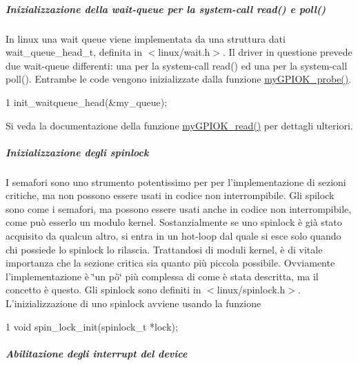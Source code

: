 \subparagraph*{Inizializzazione della wait-\/queue per la system-\/call read() e poll()}

In linux una wait queue viene implementata da una struttura dati wait\+\_\+queue\+\_\+head\+\_\+t, definita in $<$linux/wait.\+h$>$. Il driver in questione prevede due wait-\/queue differenti\+: una per la system-\/call read() ed una per la system-\/call poll(). Entrambe le code vengono inizializzate dalla funzione \hyperlink{group___linux-_driver_gae40973a06d72f7c41a9af07513a62307}{my\+G\+P\+I\+O\+K\+\_\+probe()}. 
\begin{DoxyCode}
1 init\_waitqueue\_head(&my\_queue);
\end{DoxyCode}
 Si veda la documentazione della funzione \hyperlink{group___linux-_driver_ga90ac339df9c02ae5f11a2a7727adc923}{my\+G\+P\+I\+O\+K\+\_\+read()} per dettagli ulteriori.

\subparagraph*{Inizializzazione degli spinlock}

I semafori sono uno strumento potentissimo per per l'implementazione di sezioni critiche, ma non possono essere usati in codice non interrompibile. Gli spilock sono come i semafori, ma possono essere usati anche in codice non interrompibile, come può esserlo un modulo kernel. Sostanzialmente se uno spinlock è già stato acquisito da qualcun altro, si entra in un hot-\/loop dal quale si esce solo quando chi possiede lo spinlock lo rilascia. Trattandosi di moduli kernel, è di vitale importanza che la sezione critica sia quanto più piccola possibile. Ovviamente l'implementazione è \char`\"{}un pò\char`\"{} più complessa di come è stata descritta, ma il concetto è questo. Gli spinlock sono definiti in $<$linux/spinlock.\+h$>$. L'inizializzazione di uno spinlock avviene usando la funzione 
\begin{DoxyCode}
1 void spin\_lock\_init(spinlock\_t *lock);
\end{DoxyCode}


\subparagraph*{Abilitazione degli interrupt del device}

